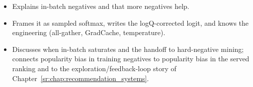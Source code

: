 \begin{interviewq}

\goodgreat
\begin{itemize}
    \item {} Explains in-batch negatives and that more negatives help.
    \item {} Frames it as sampled softmax, writes the logQ-corrected logit, and knows the engineering (all-gather, GradCache, temperature).
    \item {} Discusses when in-batch saturates and the handoff to hard-negative mining; connects popularity bias in training negatives to popularity bias in the served ranking and to the exploration/feedback-loop story of Chapter~\ref{sr:chap:recommendation_systems}.
\end{itemize}

\end{interviewq}


